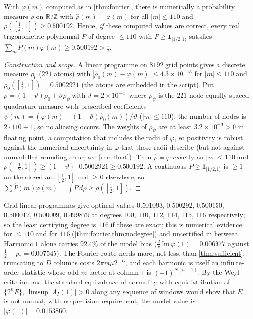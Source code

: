 \documentclass[11pt]{article}
\newcommand{\ind}{\mathbf 1}
\begin{document}
\begin{proposition}\label{thm:nodegree}
With $\varphi(m)$ computed as in \cref{thm:fourier}, there is numerically a probability measure $\rho$ on $\mathbb R/\mathbb Z$ with $\hat\rho(m)=\varphi(m)$ for all $|m|\le110$ and $\rho([\tfrac12,1])\ge0.500192$. Hence, \emph{if} these computed values are correct, every real trigonometric polynomial $P$ of degree $\le110$ with $P\ge\ind_{[1/2,1)}$ satisfies $\sum_m\hat P(m)\varphi(m)\ge0.500192>\tfrac12$.
\end{proposition}

\begin{proof}[Construction and scope]
A linear programme on $8192$ grid points gives a discrete measure $\rho_0$ ($221$ atoms) with $|\hat\rho_0(m)-\varphi(m)|\le4.3\times10^{-13}$ for $|m|\le110$ and $\rho_0([\tfrac12,1])=0.5002921$ (the atoms are embedded in the script). Put $\rho=(1-\vartheta)\rho_0+\vartheta\rho_\psi$ with $\vartheta=2\times10^{-4}$, where $\rho_\psi$ is the $221$-node equally spaced quadrature measure with prescribed coefficients $\psi(m)=(\varphi(m)-(1-\vartheta)\hat\rho_0(m))/\vartheta$ ($|m|\le110$); the number of nodes is $2\cdot110+1$, so no aliasing occurs. The weights of $\rho_\psi$ are at least $3.2\times10^{-3}>0$ in floating point, a computation that includes the radii of $\varphi$, so positivity is robust against the numerical uncertainty in $\varphi$ that those radii describe (but not against unmodelled rounding error; see \cref{rem:float}). Then $\hat\rho=\varphi$ exactly on $|m|\le110$ and $\rho([\tfrac12,1])\ge(1-\vartheta)\cdot0.5002921\ge0.500192$. A continuous $P\ge\ind_{[1/2,1)}$ is $\ge1$ on the closed arc $[\tfrac12,1]$ and $\ge0$ elsewhere, so $\sum\hat P(m)\varphi(m)=\int P\,d\rho\ge\rho([\tfrac12,1])$.
\end{proof}

\begin{remark}
Grid linear programmes give optimal values $0.501093$, $0.500292$, $0.500150$, $0.500012$, $0.500009$, $0.499879$ at degrees $100$, $110$, $112$, $114$, $115$, $116$ respectively; so the least certifying degree is $116$ if these are exact; this is numerical evidence for $\le110$ and for $116$ (\cref{thm:fourier,thm:nodegree}) and uncertified in between. Harmonic $1$ alone carries $92.4\%$ of the model bias ($\tfrac2\pi\,\mathrm{Im}\,\varphi(1)=0.006977$ against $\tfrac12-p_*=0.007545$). The Fourier route needs more, not less, than \cref{thm:sufficient}: truncating to $D$ columns costs $2\pi m\mu2^{-D}$, and each harmonic is itself an infinite-order statistic whose odd-$m$ factor at column $1$ is $(-1)^{N(n+1)}$. By the Weyl criterion and the standard equivalence of normality with equidistribution of $\{2^nE\}$, $\limsup|A_I(1)|>0$ along any sequence of windows would show that $E$ is not normal, with no precision requirement; the model value is $|\varphi(1)|=0.0153860$.
\end{remark}
\end{document}
